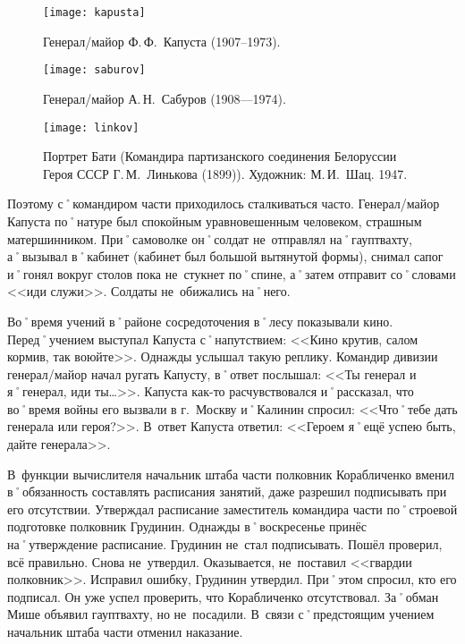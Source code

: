 \begin{figure}[h]
	\centering
	
	\begin{minipage}[h]{0.3\textwidth}			
		\texttt{[image: kapusta]}
		\caption{Генерал\-/майор Ф.\,Ф.~Капуста (1907--1973).}
		\label{fig:kapusta}		
	\end{minipage}	
	\hfill
	\begin{minipage}[h]{0.3\textwidth}			
		\texttt{[image: saburov]}
		\caption{Генерал\-/майор А.\,Н.~Сабуров (1908—1974).}
		\label{fig:saburov}
	\end{minipage}
	\hfill
	\begin{minipage}[h]{0.3\textwidth}		
		\texttt{[image: linkov]}
		\caption{Портрет Бати (Командира партизанского соединения Белоруссии Героя СССР Г.\,М.~Линькова (1899)). Художник: М.\,И.~Шац. 1947.}
		\label{fig:linkov}
	\end{minipage}
\end{figure}

Поэтому с˚командиром части приходилось сталкиваться часто. Генерал\-/майор Капуста по˚натуре был спокойным уравновешенным человеком, страшным матершинником. При˚самоволке он˚солдат не~отправлял на˚гауптвахту, а˚вызывал в˚кабинет (кабинет был большой вытянутой формы), снимал сапог и˚гонял вокруг столов пока не~стукнет по˚спине, а˚затем отправит со˚словами <<иди служи>>. Солдаты не~обижались на˚него.

Во˚время учений в˚районе сосредоточения в˚лесу показывали кино. Перед˚учением выступал Капуста с˚напутствием: <<Кино крутив, салом кормив, так воюйте>>. Однажды услышал такую реплику. Командир дивизии генерал\-/майор начал ругать Капусту, в˚ответ послышал: <<Ты генерал и я˚генерал, иди ты…>>. Капуста как-то расчувствовался и˚рассказал, что во˚время войны его вызвали в г.~Москву и˚Калинин спросил: <<Что˚тебе дать генерала или героя?>>. В~ответ Капуста ответил: <<Героем я˚ещё успею быть, дайте генерала>>. 

В~функции вычислителя начальник штаба части полковник Корабличенко вменил в˚обязанность составлять расписания занятий, даже разрешил подписывать при его отсутствии. Утверждал расписание заместитель командира части по˚строевой подготовке полковник Грудинин. Однажды в˚воскресенье принёс на˚утверждение расписание. Грудинин не~стал подписывать. Пошёл проверил, всё правильно. Снова не~утвердил. Оказывается, не~поставил <<гвардии полковник>>. Исправил ошибку, Грудинин утвердил. При˚этом спросил, кто его подписал. Он уже успел проверить, что Корабличенко отсутствовал. За˚обман Мише объявил гауптвахту, но не~посадили. В~связи с˚предстоящим учением начальник штаба части отменил наказание.

